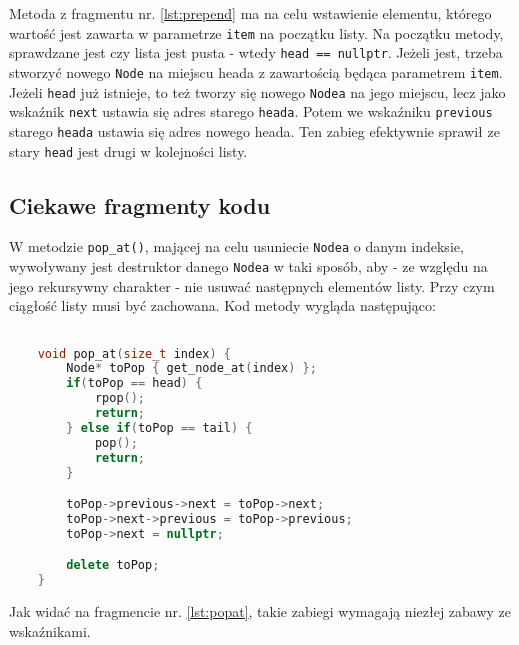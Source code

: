 Metoda z fragmentu nr. \ref{lst:prepend} ma na celu wstawienie elementu, którego wartość jest zawarta w parametrze \texttt{item} na początku listy. Na początku metody, sprawdzane jest czy lista jest pusta - wtedy \texttt{head == nullptr}. Jeżeli jest, trzeba stworzyć nowego \texttt{Node} na miejscu heada z zawartością będąca parametrem \texttt{item}. Jeżeli \texttt{head} już istnieje, to też tworzy się nowego \texttt{Nodea} na jego miejscu, lecz jako wskaźnik \texttt{next} ustawia się adres starego \texttt{heada}. Potem we wskaźniku \texttt{previous} starego \texttt{heada} ustawia się adres nowego heada. Ten zabieg efektywnie sprawił ze stary \texttt{head} jest drugi w kolejności listy.

\subsection{Ciekawe fragmenty kodu}

W metodzie \texttt{pop\_at()}, mającej na celu usuniecie \texttt{Nodea} o danym indeksie, wywoływany jest destruktor danego \texttt{Nodea} w taki sposób, aby - ze względu na jego rekursywny charakter - nie usuwać następnych elementów listy. Przy czym ciągłość listy musi być zachowana. Kod metody wygląda następująco:

\begin{lstlisting}[caption=Kod \texttt{pop\_at()}, label={lst:popat}, language=C++]

	void pop_at(size_t index) {
		Node* toPop { get_node_at(index) };
		if(toPop == head) {
			rpop();
			return;
		} else if(toPop == tail) {
			pop();
			return;
		}

		toPop->previous->next = toPop->next;
		toPop->next->previous = toPop->previous;
		toPop->next = nullptr;

		delete toPop;
	}

\end{lstlisting}

Jak widać na fragmencie nr. \ref{lst:popat}, takie zabiegi wymagają niezłej zabawy ze wskaźnikami. 


